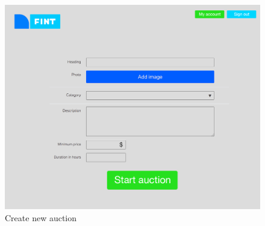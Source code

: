 \begin{figure}
	\caption{Create new auction}
	\centering
		\includegraphics[scale=0.38]{figures/Create-new-auction}
\end{figure}





